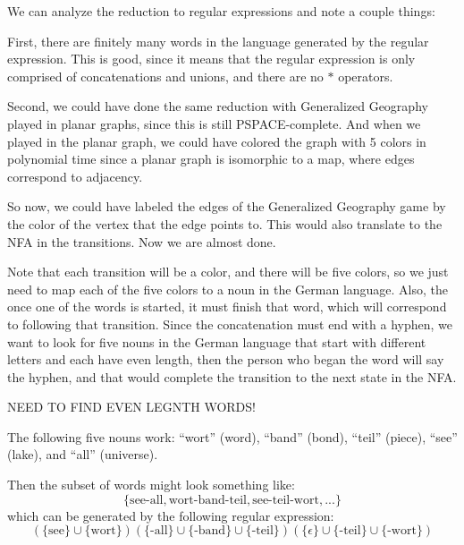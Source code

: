 \documentclass[11pt]{article}
\begin{document}
We can analyze the reduction to regular expressions and note a couple things:

First, there are finitely many words in the language generated by the regular expression. This is good, since it means that the regular expression is only comprised of concatenations and unions, and there are no $*$ operators. 

Second, we could have done the same reduction with Generalized Geography played in planar graphs, since this is still PSPACE-complete. And when we played in the planar graph, we could have colored the graph with 5 colors in polynomial time since a planar graph is isomorphic to a map, where edges correspond to adjacency. 

So now, we could have labeled the edges of the Generalized Geography game by the color of the vertex that the edge points to. This would also translate to the NFA in the transitions. Now we are almost done. 

Note that each transition will be a color, and there will be five colors, so we just need to map each of the five colors to a noun in the German language. Also, the once one of the words is started, it must finish that word, which will correspond to following that transition. Since the concatenation must end with a hyphen, we want to look for five nouns in the German language that start with different letters and each have even length, then the person who began the word will say the hyphen, and that would complete the transition to the next state in the NFA. 

NEED TO FIND EVEN LEGNTH WORDS!

The following five nouns work: ``wort'' (word), ``band'' (bond), ``teil'' (piece), ``see'' (lake), and ``all'' (universe). 

Then the subset of words might look something like:
\[ \{ \text{see-all}, \text{wort-band-teil}, \text{see-teil-wort}, ... \} \]
which can be generated by the following regular expression:
\[ (\{\text{see} \}\cup \{ \text{wort}\})(\{\text{-all} \} \cup \{\text{-band}\} \cup \{ \text{-teil} \})( \{ \epsilon\} \cup \{ \text{-teil} \} \cup \{\text{-wort} \}) \]
\end{document}
